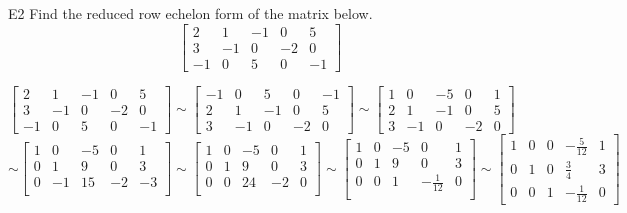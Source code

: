 \begin{problem}{E2}
Find the reduced row echelon form of the matrix below.
\[
  \begin{bmatrix}
    2 & 1 & -1 & 0 & 5 \\
    3 & -1 & 0 & -2 & 0 \\
    -1 & 0 & 5 & 0 & -1
  \end{bmatrix}
\]
\end{problem}
\begin{solution}
\[
  \begin{bmatrix}
   2 & 1 & -1 & 0 & 5 \\
   3 & -1 & 0 & -2 & 0 \\
   -1 & 0 & 5 & 0 & -1
  \end{bmatrix} \sim
  \begin{bmatrix}
   -1 & 0 & 5 & 0 & -1  \\
   2 & 1 & -1 & 0 & 5 \\
   3 & -1 & 0 & -2 & 0
  \end{bmatrix} \sim
  \begin{bmatrix}
   1 & 0 & -5 & 0 & 1 \\
   2 & 1 & -1 & 0 & 5 \\
   3 & -1 & 0 & -2 & 0
  \end{bmatrix}
\]
\[
  \sim
  \begin{bmatrix}
   1 & 0 & -5 & 0 & 1  \\
   0 & 1 & 9 & 0 & 3 \\
   0 & -1 & 15 & -2 & -3 \\
  \end{bmatrix} \sim
  \begin{bmatrix}
   1 & 0 & -5 & 0 & 1  \\
   0 & 1 & 9 & 0 & 3 \\
   0 & 0 & 24 & -2 & 0 \\
  \end{bmatrix} \sim
  \begin{bmatrix}
   1 & 0 & -5 & 0 & 1 \\
   0 & 1 & 9 & 0 & 3 \\
   0 & 0 & 1 & -\frac{1}{12} & 0 \\
  \end{bmatrix} \sim
  \begin{bmatrix}
  1 & 0 & 0 & -\frac{5}{12} & 1 \\
   0 & 1 & 0 & \frac{3}{4} & 3 \\
   0 & 0 & 1 & -\frac{1}{12} & 0
  \end{bmatrix}
\]
\end{solution}

